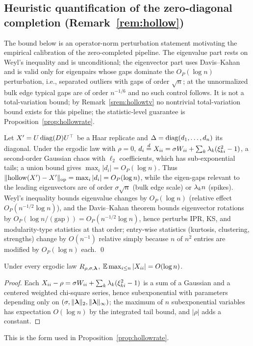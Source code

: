 \subsection{Heuristic quantification of the zero-diagonal completion
(Remark~\ref{rem:hollow})}
The bound below is an operator-norm perturbation statement motivating
the empirical calibration of the zero-completed pipeline. The
eigenvalue part rests on Weyl's inequality and is unconditional; the
eigenvector part uses Davis--Kahan and is valid only for eigenpairs
whose gaps dominate the $O_P(\log n)$ perturbation, i.e., separated
outliers with gaps of order $\sqrt n$; at the unnormalized bulk edge
typical gaps are of order $n^{-1/6}$ and no such control follows. It is not a total-variation bound; by Remark~\ref{srem:hollowtv}
no nontrivial total-variation bound exists for this pipeline; the
statistic-level guarantee is Proposition~\ref{prop:hollowrate}.


Let $X'=U\operatorname{diag}(D)U^\top$ be a Haar replicate and
$\Delta=\operatorname{diag}(d_1,\dots,d_n)$ its diagonal. Under the ergodic law with
$\rho=0$, $d_i\overset{d}{=} X_{ii}=\sigma W_{ii}+\sum_k\lambda_k(\xi_{ki}^2-1)$, a
second-order Gaussian chaos with $\ell_2$ coefficients, which has
sub-exponential tails; a union bound gives
$\max_i|d_i|=O_P(\log n)$. Thus
$\lVert\mathrm{hollow}(X')-X'\rVert_{\rm op}=\max_i|d_i|=O_P(\log n)$,
while the eigen-gaps relevant to the leading eigenvectors are of order
$\sigma\sqrt n$ (bulk edge scale) or $\lambda_kn$ (spikes). Weyl's
inequality bounds eigenvalue changes by $O_P(\log n)$
(relative effect $O_P(n^{-1/2}\log n)$), and the Davis--Kahan theorem
bounds eigenvector rotations by
$O_P(\log n/(\text{gap}))=O_P(n^{-1/2}\log n)$, hence perturbs IPR, KS,
and modularity-type statistics at that order; entry-wise statistics
(kurtosis, clustering, strengths) change by $O(n^{-1})$ relative simply
because $n$ of $n^2$ entries are modified by $O_P(\log n)$ each.
\qed

\begin{lemma}
\label{slem:diagmax}
Under every ergodic law $R_{\rho,\sigma,\bm{\lambda}}$,
$\mathbb{E}\max_{i\le n}|X_{ii}|=O(\log n)$.
\end{lemma}
\begin{proof}
Each $X_{ii}-\rho=\sigma W_{ii}+\sum_k\lambda_k(\xi_{ki}^2-1)$ is a sum
of a Gaussian and a centered weighted chi-square series, hence
subexponential with parameters depending only on
$(\sigma,\lVert\bm{\lambda}\rVert_2,\lVert\bm{\lambda}\rVert_\infty)$; the maximum
of $n$ subexponential variables has expectation $O(\log n)$ by the
integrated tail bound, and $|\rho|$ adds a constant.
\end{proof}
This is the form used in Proposition~\ref{prop:hollowrate}.
